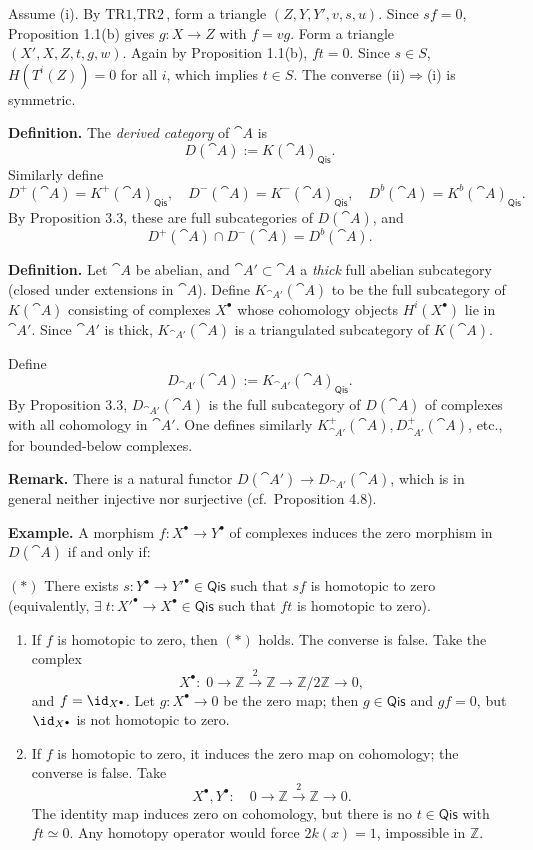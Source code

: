 Assume (i). By \(\text{TR1},\text{TR2}\), form a triangle \((Z,Y,Y',v,s,u)\). Since \(sf=0\), Proposition 1.1(b) gives \(g\colon X\to Z\) with \(f=vg\). Form a triangle \((X',X,Z,t,g,w)\). Again by Proposition 1.1(b), \(ft=0\). Since \(s\in S\), \(H(T^i(Z))=0\) for all \(i\), which implies \(t\in S\). The converse (ii)\(\Rightarrow\)(i) is symmetric.

\medskip
\textbf{Definition.}
The \textit{derived category} of \(\cat{A}\) is
\[
D(\cat{A}) := K(\cat{A})_{\mathsf{Qis}}.
\]
Similarly define
\[
D^+(\cat{A})=K^+(\cat{A})_{\mathsf{Qis}},\quad
D^-(\cat{A})=K^-(\cat{A})_{\mathsf{Qis}},\quad
D^b(\cat{A})=K^b(\cat{A})_{\mathsf{Qis}}.
\]
By Proposition 3.3, these are full subcategories of \(D(\cat{A})\), and
\[
D^+(\cat{A})\cap D^-(\cat{A}) = D^b(\cat{A}).
\]

\setcounter{page}{38}
\textbf{Definition.}
Let \(\cat{A}\) be abelian, and \(\cat{A}'\subset\cat{A}\) a \textit{thick} full abelian subcategory (closed under extensions in \(\cat{A}\)). Define \(K_{\cat{A}'}(\cat{A})\) to be the full subcategory of \(K(\cat{A})\) consisting of complexes \(X^\bullet\) whose cohomology objects \(H^i(X^\bullet)\) lie in \(\cat{A}'\). Since \(\cat{A}'\) is thick, \(K_{\cat{A}'}(\cat{A})\) is a triangulated subcategory of \(K(\cat{A})\).

Define
\[
D_{\cat{A}'}(\cat{A}) := K_{\cat{A}'}(\cat{A})_{\mathsf{Qis}}.
\]
By Proposition 3.3, \(D_{\cat{A}'}(\cat{A})\) is the full subcategory of \(D(\cat{A})\) of complexes with all cohomology in \(\cat{A}'\). One defines similarly \(K_{\cat{A}'}^+(\cat{A}), D_{\cat{A}'}^+(\cat{A})\), etc., for bounded-below complexes.

\textbf{Remark.} There is a natural functor \(D(\cat{A}')\to D_{\cat{A}'}(\cat{A})\), which is in general neither injective nor surjective (cf.\ Proposition 4.8).

\medskip
\textbf{Example.}
A morphism \(f\colon X^\bullet\to Y^\bullet\) of complexes induces the zero morphism in \(D(\cat{A})\) if and only if:

\((*)\) There exists \(s\colon Y^\bullet\to Y'^\bullet\in\mathsf{Qis}\) such that \(sf\) is homotopic to zero (equivalently, \(\exists\;t\colon X'^\bullet\to X^\bullet\in\mathsf{Qis}\) such that \(ft\) is homotopic to zero).

\setcounter{page}{39}
\begin{enumerate}
\item If \(f\) is homotopic to zero, then \((*)\) holds. The converse is false.
Take the complex
\[
X^\bullet:\; 0\to\mathbb{Z}\xrightarrow{2}\mathbb{Z}\to\mathbb{Z}/2\mathbb{Z}\to 0,
\]
and \(f=\id_{X^\bullet}\). Let \(g\colon X^\bullet\to 0\) be the zero map; then \(g\in\mathsf{Qis}\) and \(gf=0\), but \(\id_{X^\bullet}\) is not homotopic to zero.

\item If \(f\) is homotopic to zero, it induces the zero map on cohomology; the converse is false.
Take
\[
X^\bullet,Y^\bullet:\quad 0\to\mathbb{Z}\xrightarrow{2}\mathbb{Z}\to 0.
\]
The identity map induces zero on cohomology, but there is no \(t\in\mathsf{Qis}\) with \(ft\simeq 0\). Any homotopy operator would force \(2k(x)=1\), impossible in \(\mathbb{Z}\).
\end{enumerate}

